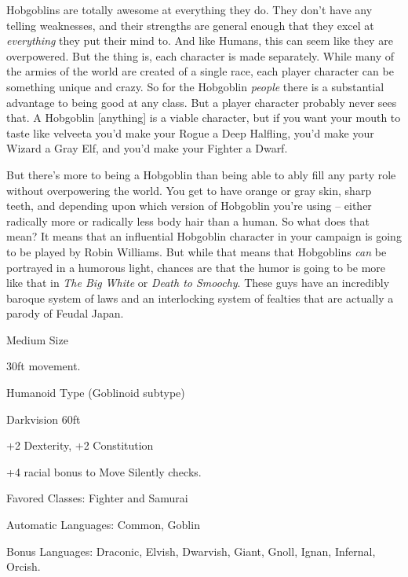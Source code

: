 
Hobgoblins are totally awesome at everything they do. They don't have any telling weaknesses, and their strengths are general enough that they excel at \textit{everything} they put their mind to. And like Humans, this can seem like they are overpowered. But the thing is, each character is made separately. While many of the armies of the world are created of a single race, each player character can be something unique and crazy. So for the Hobgoblin \textit{people} there is a substantial advantage to being good at any class. But a player character probably never sees that. A Hobgoblin [anything] is a viable character, but if you want your mouth to taste like velveeta you'd make your Rogue a Deep Halfling, you'd make your Wizard a Gray Elf, and you'd make your Fighter a Dwarf.

But there's more to being a Hobgoblin than being able to ably fill any party role without overpowering the world. You get to have orange or gray skin, sharp teeth, and depending upon which version of Hobgoblin you're using -- either radically more or radically less body hair than a human. So what does that mean? It means that an influential Hobgoblin character in your campaign is going to be played by Robin Williams. But while that means that Hobgoblins \textit{can} be portrayed in a humorous light, chances are that the humor is going to be more like that in \emph{The Big White} or \emph{Death to Smoochy}. These guys have an incredibly baroque system of laws and an interlocking system of fealties that are actually 
a parody of Feudal Japan. 

\begin{itemize*}
\item Medium Size
\item 30ft movement.
\item Humanoid Type (Goblinoid subtype)
\item Darkvision 60ft
\item +2 Dexterity, +2 Constitution
\item +4 racial bonus to Move Silently checks.
\item Favored Classes: Fighter and Samurai
\item Automatic Languages: Common, Goblin
\item Bonus Languages: Draconic, Elvish, Dwarvish, Giant, Gnoll, Ignan, Infernal, Orcish. 
\end{itemize*}
